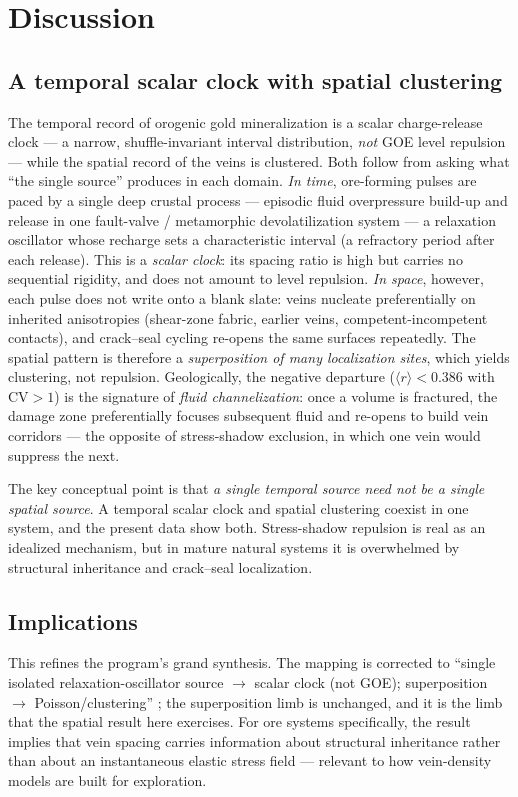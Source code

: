 \documentclass[11pt]{article}
\begin{document}
\section{Discussion}

\subsection{A temporal scalar clock with spatial clustering}
The temporal record of orogenic gold mineralization is a scalar charge-release
clock --- a narrow, shuffle-invariant interval distribution, \emph{not} GOE level
repulsion \citep{chen2026audit} --- while the spatial record of the veins is
clustered. Both follow from asking what ``the single source'' produces in each
domain. \emph{In time}, ore-forming pulses are paced by a single deep crustal
process --- episodic fluid overpressure build-up and release in one
fault-valve / metamorphic devolatilization system --- a relaxation oscillator
whose recharge sets a characteristic interval (a refractory period after each
release). This is a \emph{scalar clock}: its spacing ratio is high but carries no
sequential rigidity, and does not amount to level repulsion. \emph{In space},
however, each pulse does not write onto a blank slate: veins nucleate
preferentially on inherited anisotropies (shear-zone fabric, earlier veins,
competent-incompetent contacts), and crack--seal cycling re-opens the same
surfaces repeatedly. The spatial pattern is therefore a \emph{superposition of
many localization sites}, which yields clustering, not repulsion. Geologically,
the negative departure ($\langle r\rangle<0.386$ with $\mathrm{CV}>1$) is the
signature of \emph{fluid channelization}: once a volume is fractured, the damage
zone preferentially focuses subsequent fluid and re-opens to build vein
corridors --- the opposite of stress-shadow exclusion, in which one vein would
suppress the next.

The key conceptual point is that \emph{a single temporal source need not be a
single spatial source}. A temporal scalar clock and spatial clustering coexist in
one system, and the present data show both. Stress-shadow repulsion is real as an
idealized mechanism, but in mature natural systems it is overwhelmed by
structural inheritance and crack--seal localization.

\subsection{Implications}
This refines the program's grand synthesis. The mapping is corrected to
``single isolated relaxation-oscillator source $\rightarrow$ scalar clock (not
GOE); superposition $\rightarrow$ Poisson/clustering'' \citep{chen2026audit}; the
superposition limb is unchanged, and it is the limb that the spatial result here
exercises. For ore systems specifically, the result implies
that vein spacing carries information about structural inheritance rather than
about an instantaneous elastic stress field --- relevant to how vein-density
models are built for exploration.
\end{document}
